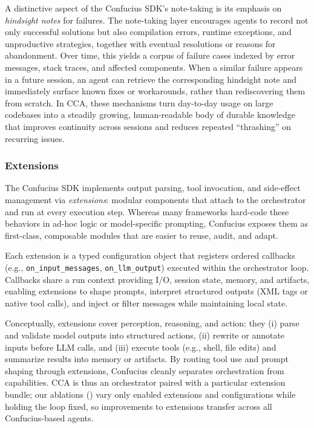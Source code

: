 A distinctive aspect of the Confucius SDK’s note-taking is its emphasis on \emph{hindsight notes} for failures. The note-taking layer encourages agents to record not only successful solutions but also compilation errors, runtime exceptions, and unproductive strategies, together with eventual resolutions or reasons for abandonment. Over time, this yields a corpus of failure cases indexed by error messages, stack traces, and affected components. When a similar failure appears in a future session, an agent can retrieve the corresponding hindsight note and immediately surface known fixes or workarounds, rather than rediscovering them from scratch. In CCA, these mechanisms turn day-to-day usage on large codebases into a steadily growing, human-readable body of durable knowledge that improves continuity across sessions and reduces repeated “thrashing” on recurring issues.



\subsubsection{Extensions}
\label{sec.extensions}

The Confucius SDK implements output parsing, tool invocation, and side-effect management via \emph{extensions}: modular components that attach to the orchestrator and run at every execution step. Whereas many frameworks hard-code these behaviors in ad-hoc logic or model-specific prompting, Confucius exposes them as first-class, composable modules that are easier to reuse, audit, and adapt.

Each extension is a typed configuration object that registers ordered callbacks (e.g., \texttt{on\_input\_messages}, \texttt{on\_llm\_output}) executed within the orchestrator loop. Callbacks share a run context providing I/O, session state, memory, and artifacts, enabling extensions to shape prompts, interpret structured outputs (XML tags or native tool calls), and inject or filter messages while maintaining local state.

Conceptually, extensions cover perception, reasoning, and action: they (i) parse and validate model outputs into structured actions, (ii) rewrite or annotate inputs before LLM calls, and (iii) execute tools (e.g., shell, file edits) and summarize results into memory or artifacts. By routing tool use and prompt shaping through extensions, Confucius cleanly separates orchestration from capabilities. CCA is thus an orchestrator paired with a particular extension bundle; our ablations () vary only enabled extensions and configurations while holding the loop fixed, so improvements to extensions transfer across all Confucius-based agents.




